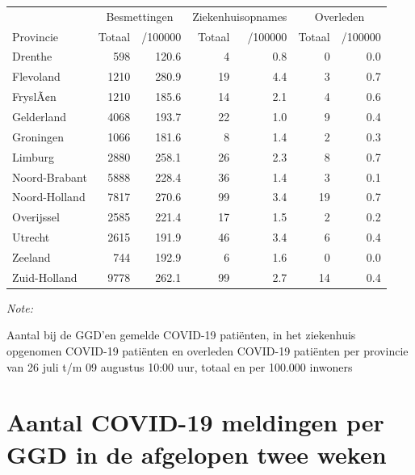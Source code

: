 \documentclass[
  english,
  man,floatsintext]{apa6}
\begin{document}
\begin{table}
\centering
\begin{threeparttable}
\begin{tabular}{lrrrrrr}
\toprule
\multicolumn{1}{c}{ } & \multicolumn{2}{c}{Besmettingen} & \multicolumn{2}{c}{Ziekenhuisopnames} & \multicolumn{2}{c}{Overleden} \\
\cmidrule(l{3pt}r{3pt}){2-3} \cmidrule(l{3pt}r{3pt}){4-5} \cmidrule(l{3pt}r{3pt}){6-7}
Provincie & Totaal & /100000 & Totaal & /100000 & Totaal & /100000\\
\midrule
Drenthe & 598 & 120.6 & 4 & 0.8 & 0 & 0.0\\
Flevoland & 1210 & 280.9 & 19 & 4.4 & 3 & 0.7\\
FryslÃ¢n & 1210 & 185.6 & 14 & 2.1 & 4 & 0.6\\
Gelderland & 4068 & 193.7 & 22 & 1.0 & 9 & 0.4\\
Groningen & 1066 & 181.6 & 8 & 1.4 & 2 & 0.3\\
Limburg & 2880 & 258.1 & 26 & 2.3 & 8 & 0.7\\
Noord-Brabant & 5888 & 228.4 & 36 & 1.4 & 3 & 0.1\\
Noord-Holland & 7817 & 270.6 & 99 & 3.4 & 19 & 0.7\\
Overijssel & 2585 & 221.4 & 17 & 1.5 & 2 & 0.2\\
Utrecht & 2615 & 191.9 & 46 & 3.4 & 6 & 0.4\\
Zeeland & 744 & 192.9 & 6 & 1.6 & 0 & 0.0\\
Zuid-Holland & 9778 & 262.1 & 99 & 2.7 & 14 & 0.4\\
\bottomrule
\end{tabular}
\begin{tablenotes}
\item \textit{Note: } 
\item Aantal bij de GGD’en gemelde COVID-19 patiënten, in het ziekenhuis opgenomen COVID-19 patiënten en overleden COVID-19 patiënten per provincie van 26 juli t/m 09 augustus 10:00 uur, totaal en per 100.000 inwoners
\end{tablenotes}
\end{threeparttable}
\end{table}

\newpage

\hypertarget{aantal-covid-19-meldingen-per-ggd-in-de-afgelopen-twee-weken}{%
\section{Aantal COVID-19 meldingen per GGD in de afgelopen twee weken}\label{aantal-covid-19-meldingen-per-ggd-in-de-afgelopen-twee-weken}}
\end{document}
